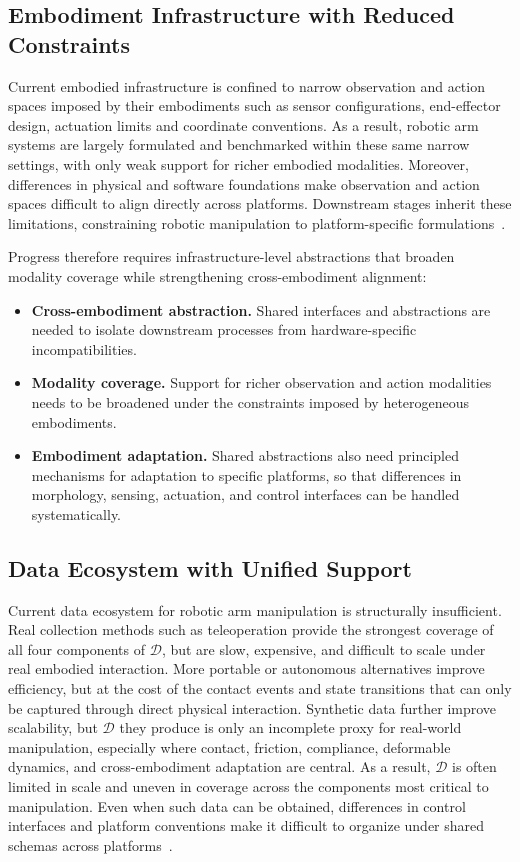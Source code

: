 \documentclass[acmsmall,screen,review]{acmart}
\begin{document}
\subsection{Embodiment Infrastructure with Reduced Constraints}\label{sec:challenge_embodiment}

Current embodied infrastructure is confined to narrow observation and action spaces imposed by their embodiments such as sensor configurations, end-effector design, actuation limits and coordinate conventions.
As a result, robotic arm systems are largely formulated and benchmarked within these same narrow settings, with only weak support for richer embodied modalities.
Moreover, differences in physical and software foundations make observation and action spaces difficult to align directly across platforms.
Downstream stages inherit these limitations, constraining robotic manipulation to platform-specific formulations~\cite{chen2026iail}. 

Progress therefore requires infrastructure-level abstractions that broaden modality coverage while strengthening cross-embodiment alignment:
\begin{itemize}
    \item \textbf{Cross-embodiment abstraction.} Shared interfaces and abstractions are needed to isolate downstream processes from hardware-specific incompatibilities.
    \item \textbf{Modality coverage.} Support for richer observation and action modalities needs to be broadened under the constraints imposed by heterogeneous embodiments.
    \item \textbf{Embodiment adaptation.} Shared abstractions also need principled mechanisms for adaptation to specific platforms, so that differences in morphology, sensing, actuation, and control interfaces can be handled systematically.
\end{itemize}

\subsection{Data Ecosystem with Unified Support}\label{sec:challenge_data}

Current data ecosystem for robotic arm manipulation is structurally insufficient.
Real collection methods such as teleoperation provide the strongest coverage of all four components of $\mathcal{D}$, but are slow, expensive, and difficult to scale under real embodied interaction. 
More portable or autonomous alternatives improve efficiency, but at the cost of the contact events and state transitions that can only be captured through direct physical interaction.
Synthetic data further improve scalability, but $\mathcal{D}$ they produce is only an incomplete proxy for real-world manipulation, especially where contact, friction, compliance, deformable dynamics, and cross-embodiment adaptation are central. 
As a result, $\mathcal{D}$ is often limited in scale and uneven in coverage across the components most critical to manipulation.
Even when such data can be obtained, differences in control interfaces and platform conventions make it difficult to organize under shared schemas across platforms~\cite{chen2025robodm}.
\end{document}
